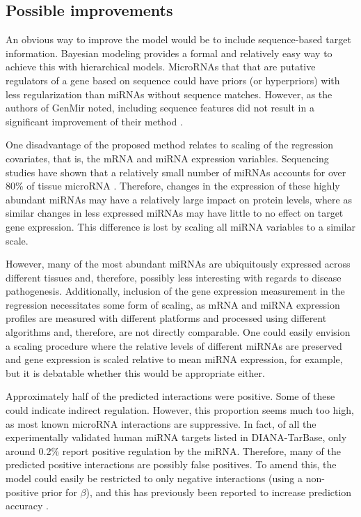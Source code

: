 \subsection*{Possible improvements}

An obvious way to improve the model would be to include sequence-based target
information. Bayesian modeling provides a formal and relatively easy way to
achieve this with hierarchical models. MicroRNAs that that are putative
regulators of a gene based on sequence could have priors (or hyperpriors) with
less regularization than miRNAs without sequence matches. However, as
the authors of GenMir noted, including sequence features did not result
in a significant improvement of their method \citep{Huang2007}.

One disadvantage of the proposed method relates to scaling of the regression
covariates, that is, the mRNA and miRNA expression variables. Sequencing studies have shown
that a relatively small number of miRNAs accounts for over 80\% of tissue microRNA
\citep{Landgraf2007}. Therefore, changes in the expression of these highly
abundant miRNAs may have a relatively large impact on protein levels, where as
similar changes in less expressed miRNAs may have little to no effect on target gene
expression. This difference is lost by scaling all miRNA variables to a similar scale.

However, many of the most abundant miRNAs are ubiquitously expressed across
different tissues \citep{Landgraf2007} and, therefore, possibly less
interesting with regards to disease pathogenesis. Additionally, inclusion of
the gene expression measurement in the regression necessitates some form of
scaling, as mRNA and miRNA expression profiles are measured with different platforms
and processed using different algorithms and, therefore, are not directly
comparable. One could easily envision a scaling procedure where the relative
levels of different miRNAs are preserved and gene expression is scaled
relative to mean miRNA expression, for example, but it is debatable whether
this would be appropriate either.

Approximately half of the predicted interactions were positive. Some of these
could indicate indirect regulation. However, this proportion seems much too
high, as most known microRNA interactions are suppressive. In fact, of all the
experimentally validated human miRNA targets listed in DIANA-TarBase, only
around 0.2\% report positive regulation by the miRNA. Therefore, many of the
predicted positive interactions are possibly false positives. To amend this,
the model could easily be restricted to only negative interactions (using a
non-positive prior for $\beta$), and this has previously been reported to
increase prediction accuracy \citep{Muniategui2013}.


